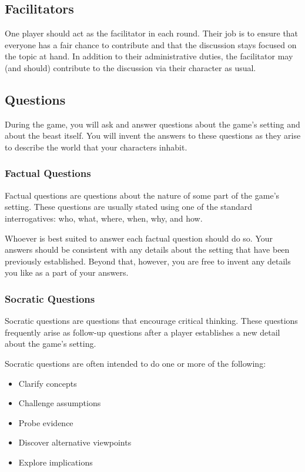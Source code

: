 \documentclass[a6paper, 11pt, parskip=half, DIV=15]{scrartcl}
\begin{document}
\subsection*{Facilitators}
One player should act as the facilitator in each round. Their job is to ensure that everyone has a fair chance to contribute and that the discussion stays focused on the topic at hand. In addition to their administrative duties, the facilitator may (and should) contribute to the discussion via their character as usual. 

\newpage
\enlargethispage{1.75\baselineskip}

\subsection*{Questions}
During the game, you will ask and answer questions about the game's setting and about the beast itself.
You will invent the answers to these questions as they arise to describe the world that your characters inhabit.

\subsubsection*{Factual Questions}

Factual questions are questions about the nature of some part of the game's setting.
These questions are usually stated using one of the standard interrogatives: who, what, where, when, why, and how.

Whoever is best suited to answer each factual question should do so.
Your answers should be consistent with any details about the setting that have been previously established.
Beyond that, however, you are free to invent any details you like as a part of your answers.

\newpage
\enlargethispage{1.75\baselineskip}

\subsubsection*{Socratic Questions}
Socratic questions are questions that encourage critical thinking.
These questions frequently arise as follow-up questions after a player establishes a new detail about the game's setting.

Socratic questions are often intended to do one or more of the following:
\begin{itemize}[nosep]
	\item Clarify concepts
	\item Challenge assumptions
	\item Probe evidence
	\item Discover alternative viewpoints
	\item Explore implications
\end{itemize}
\end{document}
